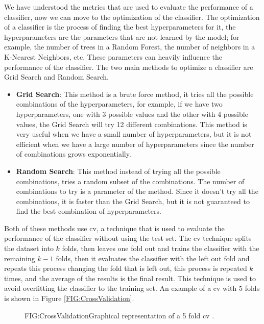 We have understood the metrics that are used to evaluate the performance of a classifier, now we can move to the optimization of the classifier. The optimization of a classifier is the process of finding the best hyperparameters for it, the hyperparameters are the parameters that are not learned by the model; for example, the number of trees in a Random Forest, the number of neighbors in a K-Nearest Neighbors, etc. These parameters can heavily influence the performance of the classifier. The two main methods to optimize a classifier are Grid Search and Random Search.

\begin{itemize}
    \item \textbf{Grid Search}: This method is a brute force method, it tries all the possible combinations of the hyperparameters, for example, if we have two hyperparameters, one with 3 possible values and the other with 4 possible values, the Grid Search will try 12 different combinations. This method is very useful when we have a small number of hyperparameters, but it is not efficient when we have a large number of hyperparameters since the number of combinations grows exponentially.
    \item \textbf{Random Search}: This method instead of trying all the possible combinations, tries a random subset of the combinations. The number of combinations to try is a parameter of the method. Since it 
    doesn't 
    try all the combinations, it is faster than the Grid Search, but it is not guaranteed to find the best combination of hyperparameters.
\end{itemize}


Both of these methods use \ac{cv}, a technique that is used to evaluate the performance of the classifier without using the test set. The \ac{cv} technique splits the dataset into $k$ folds, then leaves one fold out and trains the classifier with the remaining $k-1$ folds, then it evaluates the classifier with the left out fold and repeats this process changing the fold that is left out, this process is repeated $k$ times, and the average of the results is the final result. This technique is used to avoid overfitting the classifier to the training set. An example of a \ac{cv} with 5 folds is shown in Figure \ref{FIG:CrossValidation}.

\begin{figure}[Cross Validation]{FIG:CrossValidation}{Graphical representation of a 5 fold \ac{cv} \cite{noauthor_cross_2023}.}
\end{figure}

